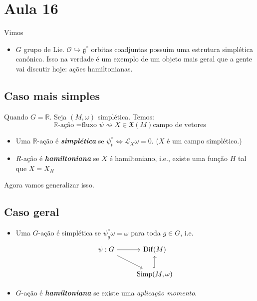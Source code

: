 \section{Aula 16}

Vimos
\begin{itemize}
\item $G$ grupo de Lie. $\mathcal{O}\hookrightarrow \mathfrak{g}^*$ orbitas coadjuntas possuim uma estrutura simplética canónica. Isso na verdade é um exemplo de um objeto mais geral que a gente vai discutir hoje: ações hamiltonianas.
\end{itemize}
\subsection{Caso mais simples}
Quando $G=\mathbb{R}$. Seja $(M,\omega)$ simplética. Temos:
\[\mathbb{R}\text{-ação =fluxo }\psi \rightsquigarrow X \in\mathfrak{X}(M) \text{campo de vetores}  \]
\begin{defn}\leavevmode
\begin{itemize}
\item Uma $\mathbb{R}$-ação é \textit{\textbf{simplética}} se $\psi_t^*\iff\mathcal{L}_{X}\omega=0$. ($X$ é um campo simplético.)
\item $R$-ação é \textit{\textbf{hamiltoniana}} se  $X$ é hamiltoniano, i.e., existe uma função $H$ tal que $X=X_H$
\end{itemize}
\end{defn}

Agora vamos generalizar isso.

\subsection{Caso geral}

\begin{defn}\leavevmode
	\begin{itemize}
	\item Uma $G$-ação é simplética se $\psi_{g}^*\omega=\omega$ para toda $g \in G$, i.e.
		\[\begin{tikzcd}
			 \psi:G\arrow[r]\arrow[dr]&\operatorname{Dif}(M)\\
			  &\operatorname{S im p}(M,\omega)\arrow[u,hook]
		\end{tikzcd}\]
		
	\item $G$-ação é \textit{\textbf{hamiltoniana}} se existe uma \textit{aplicação momento}.
	\end{itemize}
\end{defn}

